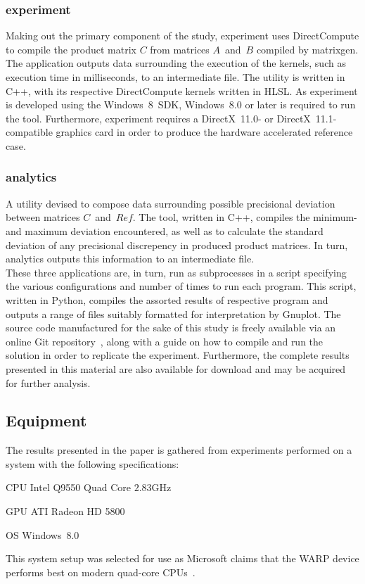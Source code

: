 \subsubsection{experiment}
Making out the primary component of the study, experiment uses DirectCompute to compile the product matrix $C$ from matrices $A$~and~$B$ compiled by matrixgen.
The application outputs data surrounding the execution of the kernels, such as execution time in milliseconds, to an intermediate file.
The utility is written in C++, with its respective DirectCompute kernels written in HLSL.
As experiment is developed using the Windows~8~SDK, Windows~8.0 or later is required to run the tool.
Furthermore, experiment requires a DirectX~11.0- or DirectX~11.1-compatible graphics card in order to produce the hardware accelerated reference case.

\subsubsection{analytics}
A utility devised to compose data surrounding possible precisional deviation between matrices $C$~and~$Ref$.
The tool, written in C++, compiles the minimum- and maximum  deviation encountered, as well as to calculate the standard deviation of any precisional discrepency in produced product matrices.
In turn, analytics outputs this information to an intermediate file.\\

These three applications are, in turn, run as subprocesses in a script specifying the various configurations and number of times to run each program.
This script, written in Python, compiles the assorted results of respective program and outputs a range of files suitably formatted for interpretation by Gnuplot.
The source code manufactured for the sake of this study is freely available via an online Git repository~, along with a guide on how to compile and run the solution in order to replicate the experiment.
Furthermore, the complete results presented in this material are also available for download and may be acquired for further analysis.

\subsection{Equipment}
\label{sec:contribution:equipment}
The results presented in the paper is gathered from experiments performed on a system with the following specifications:
\begin{description*}
	\item[CPU] Intel Q9550 Quad Core $2.83$GHz
	\item[GPU] ATI Radeon HD 5800
	\item[OS\phantom{U}] Windows~8.0
\end{description*}
This system setup was selected for use as Microsoft claims that the WARP device performs best on modern quad-core CPUs~.

